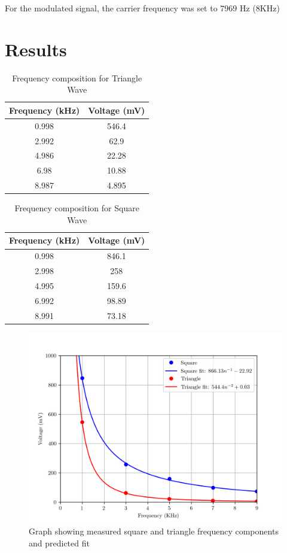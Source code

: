 \documentclass[12pt]{article}
\begin{document}
For the modulated signal, the carrier frequency was set to $7969$ Hz (8KHz) 

\section{Results}

\begin{table}[h]
    \centering
    \caption{Frequency composition for Triangle Wave}
    \begin{tabular}{|c|c|}
    \hline
    Frequency (kHz) & Voltage (mV) \\ \hline
    0.998           & 546.4        \\
    2.992           & 62.9         \\
    4.986           & 22.28        \\
    6.98            & 10.88        \\
    8.987           & 4.895        \\ \hline
    \end{tabular}
\end{table}

\begin{table}[h]
    \centering
    \caption{Frequency composition for Square Wave}
    \begin{tabular}{|c|c|}
    \hline
    Frequency (kHz) & Voltage (mV) \\ \hline
    0.998           & 846.1        \\
    2.998           & 258          \\
    4.995           & 159.6        \\
    6.992           & 98.89        \\
    8.991           & 73.18        \\ \hline
    \end{tabular}
\end{table}

\begin{figure}[h]
    \centering
    \includegraphics[width=1\textwidth]{square_triangle.png}
    \caption{Graph showing measured square and triangle frequency components and predicted fit}
    \label{fig:square_triangle}
\end{figure}
\end{document}
